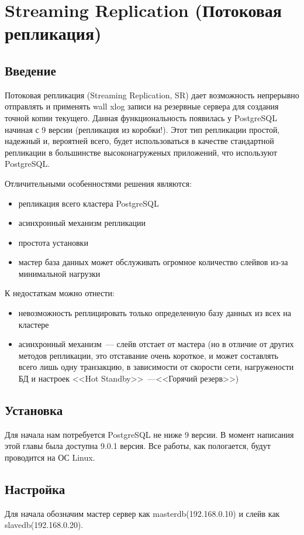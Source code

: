 \section{Streaming Replication (Потоковая репликация)}
\subsection{Введение}
Потоковая репликация (Streaming Replication, SR) дает возможность непрерывно отправлять и применять 
wall xlog записи на резервные сервера для создания точной копии текущего. Данная функциональность 
появилась у PostgreSQL начиная с 9 версии (репликация из коробки!). Этот тип репликации простой, надежный и, вероятней всего,  
будет использоваться в качестве стандартной репликации в большинстве высоконагруженых приложений, что используют PostgreSQL. 

Отличительными особенностями решения являются:
\begin{itemize}
\item репликация всего кластера PostgreSQL
\item асинхронный механизм репликации
\item простота установки
\item мастер база данных может обслуживать огромное количество слейвов из-за минимальной нагрузки
\end{itemize}

К недостаткам можно отнести:
\begin{itemize}
\item невозможность реплицировать только определенную базу данных из всех на кластере 
\item асинхронный механизм~--- слейв отстает от мастера (но в отличие от других методов репликации, 
это отставание очень короткое, и может составлять всего лишь одну транзакцию, в зависимости от скорости сети, 
нагружености БД и настроек <<Hot Standby>>~---<<Горячий резерв>>)
\end{itemize}

\subsection{Установка}
Для начала нам потребуется PostgreSQL не ниже 9 версии. В момент написания этой главы была доступна 9.0.1 версия. 
Все работы, как пологается, будут проводится на ОС Linux. 

\subsection{Настройка}
Для начала обозначим мастер сервер как masterdb(192.168.0.10) и слейв как slavedb(192.168.0.20).

